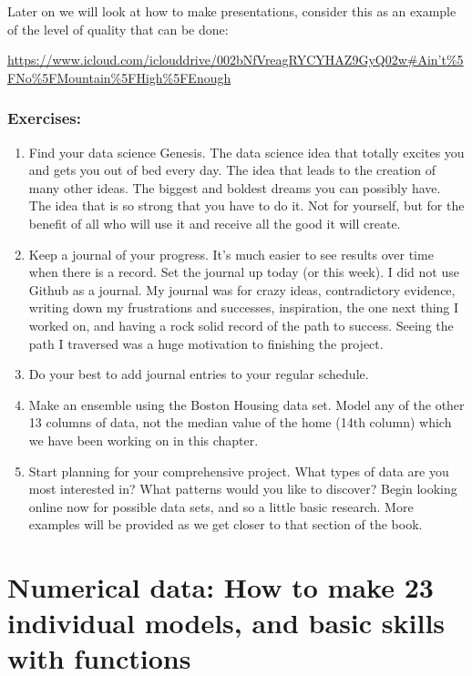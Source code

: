 \documentclass[
]{book}
\providecommand{\tightlist}{%
  \setlength{\itemsep}{0pt}\setlength{\parskip}{0pt}}
\begin{document}
Later on we will look at how to make presentations, consider this as an
example of the level of quality that can be done:

\href{https://www.icloud.com/iclouddrive/002bNfVreagRYCYHAZ9GyQ02w\#Ain't\%5FNo\%5FMountain\%5FHigh\%5FEnough}{https://www.icloud.com/iclouddrive/002bNfVreagRYCYHAZ9GyQ02w\#Ain't\%5FNo\%5FMountain\%5FHigh\%5FEnough}

\subsection{Exercises:}\label{exercises}

\begin{enumerate}
\def\labelenumi{\arabic{enumi}.}
\tightlist
\item
  Find your data science Genesis. The data science idea that totally
  excites you and gets you out of bed every day. The idea that leads
  to the creation of many other ideas. The biggest and boldest dreams
  you can possibly have. The idea that is so strong that you have to
  do it. Not for yourself, but for the benefit of all who will use it
  and receive all the good it will create.
\item
  Keep a journal of your progress. It's much easier to see results
  over time when there is a record. Set the journal up today (or this
  week). I did not use Github as a journal. My journal was for crazy
  ideas, contradictory evidence, writing down my frustrations and
  successes, inspiration, the one next thing I worked on, and having a
  rock solid record of the path to success. Seeing the path I
  traversed was a huge motivation to finishing the project.
\item
  Do your best to add journal entries to your regular schedule.
\item
  Make an ensemble using the Boston Housing data set. Model any of the
  other 13 columns of data, not the median value of the home (14th
  column) which we have been working on in this chapter.
\item
  Start planning for your comprehensive project. What types of data
  are you most interested in? What patterns would you like to
  discover? Begin looking online now for possible data sets, and so a
  little basic research. More examples will be provided as we get
  closer to that section of the book.
\end{enumerate}

\chapter{Numerical data: How to make 23 individual models, and basic skills with functions}\label{numerical-data-how-to-make-23-individual-models-and-basic-skills-with-functions}
\end{document}
